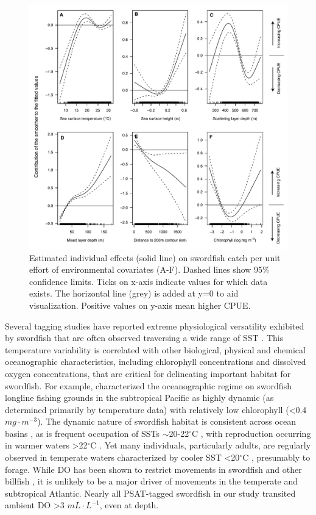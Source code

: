 \begin{figure}[b!]
\centering
\includegraphics[width=\textwidth]{images/C4_Fig6.pdf}
\caption[Estimated individual effects on swordfish catch per unit effort of environmental covariates in an additive model framework]{Estimated individual effects (solid line) on swordfish catch per unit effort of environmental covariates (A-F). Dashed lines show 95\% confidence limits. Ticks on x-axis indicate values for which data exists. The horizontal line (grey) is added at y=0 to aid visualization. Positive values on y-axis mean higher CPUE.}
\label{fig:c4f6}
\end{figure}

Several tagging studies have reported extreme physiological versatility exhibited by swordfish that are often observed traversing a wide range of SST \citep{Abecassis2012}. This temperature variability is correlated with other biological, physical and chemical oceanographic characteristics, including chlorophyll concentrations and dissolved oxygen concentrations, that are critical for delineating important habitat for swordfish. For example, \citet{Seki2002} characterized the oceanographic regime on swordfish longline fishing grounds in the subtropical Pacific as highly dynamic (as determined primarily by temperature data) with relatively low chlorophyll (<0.4 \(mg \cdot m^{-3}\)). The dynamic nature of swordfish habitat is consistent across ocean basins \citep{Hazin2008, Seki2002, Podesta1993}, as is frequent occupation of SSTs $\sim$20-22$^{\circ}$C \citep{Santos2006}, with reproduction occurring in warmer waters >22$^{\circ}$C \citep{Palko1981, Romeo2011}. Yet many individuals, particularly adults, are regularly observed in temperate waters characterized by cooler SST <20$^{\circ}$C \citep{Evans2014, Abascal2015}, presumably to forage. While DO has been shown to restrict movements in swordfish and other billfish \citep{Stramma2012, Braun2015}, it is unlikely to be a major driver of movements in the temperate and subtropical Atlantic. Nearly all PSAT-tagged swordfish in our study transited ambient DO >3 \(mL \cdot L^{-1}\), even at depth.

